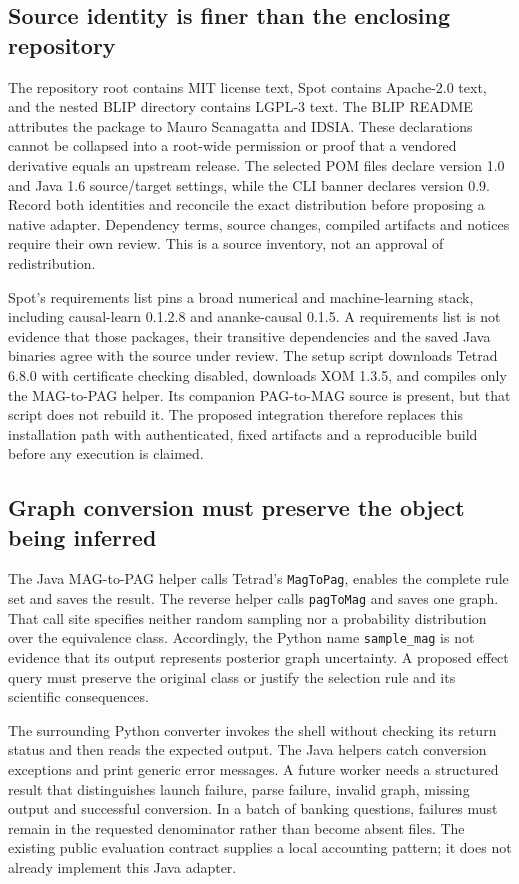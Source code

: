 \subsection{Source identity is finer than the enclosing repository}
The repository root contains MIT license text, Spot contains Apache-2.0 text,
and the nested BLIP directory contains LGPL-3 text. The BLIP README attributes
the package to Mauro Scanagatta and IDSIA. These declarations cannot be collapsed
into a root-wide permission or proof that a vendored derivative equals an
upstream release. The selected POM files declare version 1.0 and Java 1.6
source/target settings, while the CLI banner declares version 0.9. Record both
identities and reconcile the exact distribution before proposing a native
adapter. Dependency terms, source changes, compiled artifacts and notices require
their own review. This is a source inventory, not an approval of redistribution.
\citep{exec28_nested_sources}

Spot's requirements list pins a broad numerical and machine-learning stack,
including causal-learn 0.1.2.8 and ananke-causal 0.1.5. A requirements list is
not evidence that those packages, their transitive dependencies and the saved
Java binaries agree with the source under review. The setup script downloads
Tetrad 6.8.0 with certificate checking disabled, downloads XOM 1.3.5, and compiles
only the MAG-to-PAG helper. Its companion PAG-to-MAG source is present, but that
script does not rebuild it. The proposed integration therefore replaces this
installation path with authenticated, fixed artifacts and a reproducible build
before any execution is claimed.~\citep{exec28_nested_sources}

\subsection{Graph conversion must preserve the object being inferred}
The Java MAG-to-PAG helper calls Tetrad's \texttt{MagToPag}, enables the complete
rule set and saves the result. The reverse helper calls \texttt{pagToMag} and
saves one graph. That call site specifies neither random sampling nor a
probability distribution over the equivalence class. Accordingly, the Python
name \texttt{sample\_mag} is not evidence that its output represents posterior
graph uncertainty. A proposed effect query must preserve the original class
or justify the selection rule and its scientific consequences.
\citep{exec28_nested_sources}

The surrounding Python converter invokes the shell without checking its return
status and then reads the expected output. The Java helpers catch conversion
exceptions and print generic error messages. A future worker needs a structured
result that distinguishes launch failure, parse failure, invalid graph, missing
output and successful conversion. In a batch of banking questions, failures
must remain in the requested denominator rather than become absent files.
The existing public evaluation contract supplies a local accounting pattern;
it does not already implement this Java adapter.~\citep{exec28_nested_sources,exec28_fj_contract}


